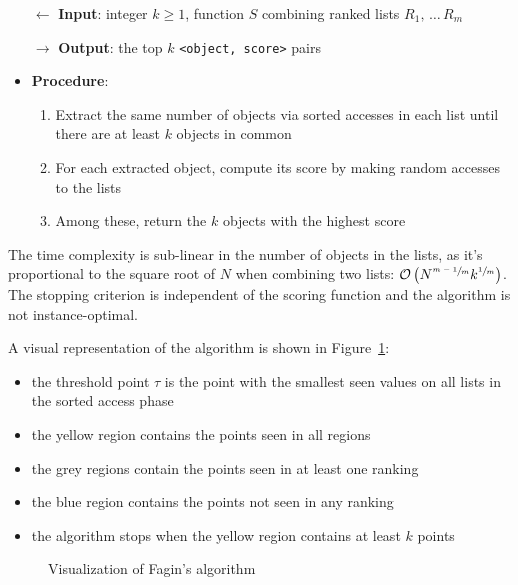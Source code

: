 \documentclass[english]{article}
\begin{document}
\begin{itemize}
  \item[\(\leftarrow\)] \textbf{Input}: integer \(k \geq 1\), function \(S\) combining ranked lists \(R_1, \,\ldots\, R_m\)
  \item[\(\rightarrow\)] \textbf{Output}: the top \(k\) \texttt{<object, score>} pairs
  \item \textbf{Procedure}:
        \begin{enumerate}[label=step \arabic*., ref=step (\arabic*), widest*=7, leftmargin=*, labelindent=1em]
          \item Extract the same number of objects via sorted accesses in each list until there are at least \(k\) objects in common
          \item For each extracted object, compute its score by making random accesses to the lists
          \item Among these, return the \(k\) objects with the highest score
        \end{enumerate}
\end{itemize}

The time complexity is sub-linear in the number of objects in the lists, as it's proportional to the square root of \(N\) when combining two lists: \(\mathcal{O}\left( N^{\sfrac{m-1}{m}} k^{\sfrac{1}{m}} \right)\).
The stopping criterion is independent of the scoring function and the algorithm is not instance-optimal.

A visual representation of the algorithm is shown in Figure~\ref{fig:fagin-algorithm}:

\begin{itemize}
  \item the threshold point \(\tau\) is the point with the smallest seen values on all lists in the sorted access phase
  \item the yellow region contains the points seen in all regions
  \item the grey regions contain the points seen in at least one ranking
  \item the blue region contains the points not seen in any ranking
  \item the algorithm stops when the yellow region contains at least \(k\) points
\end{itemize}

\begin{figure}[htbp]
  \centering
  \bigskip
  \caption{Visualization of Fagin's algorithm}
  \label{fig:fagin-algorithm}
  \bigskip
\end{figure}
\end{document}
